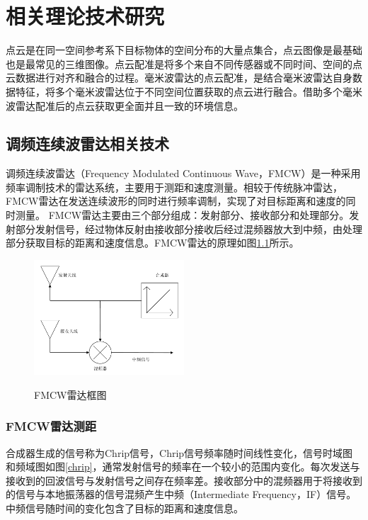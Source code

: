 \chapter{相关理论技术研究}
点云是在同一空间参考系下目标物体的空间分布的大量点集合，点云图像是最基础也是最常见的三维图像。点云配准是将多个来自不同传感器或不同时间、空间的点云数据进行对齐和融合的过程。毫米波雷达的点云配准，是结合毫米波雷达自身数据特征，将多个毫米波雷达位于不同空间位置获取的点云进行融合。借助多个毫米波雷达配准后的点云获取更全面并且一致的环境信息。
\section{调频连续波雷达相关技术}
调频连续波雷达（Frequency Modulated Continuous Wave，FMCW）\cite{brooker2005understanding}是一种采用频率调制技术的雷达系统，主要用于测距和速度测量。相较于传统脉冲雷达，FMCW雷达在发送连续波形的同时进行频率调制，实现了对目标距离和速度的同时测量。 FMCW雷达主要由三个部分组成：发射部分、接收部分和处理部分。发射部分发射信号，经过物体反射由接收部分接收后经过混频器放大到中频，由处理部分获取目标的距离和速度信息。FMCW雷达的原理如图\ref{fmcw}所示。

\begin{figure}[htbp]
	\centering
	\includegraphics[width=0.5\textwidth]{figures/fmcw.pdf}\\
	\caption{FMCW雷达框图}
	\label{fmcw}
\end{figure}

\subsection{FMCW雷达测距}
合成器生成的信号称为Chrip信号，Chrip信号频率随时间线性变化，信号时域图和频域图如图\ref{chrip}，通常发射信号的频率在一个较小的范围内变化。每次发送与接收到的回波信号与发射信号之间存在频率差。接收部分中的混频器用于将接收到的信号与本地振荡器的信号混频产生中频（Intermediate Frequency，IF）信号\cite{waters1982bandpass}。中频信号随时间的变化包含了目标的距离和速度信息。

